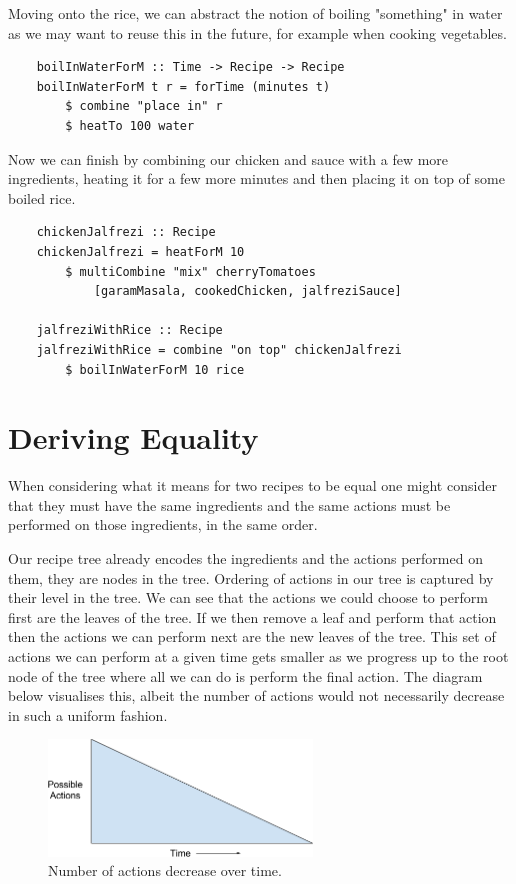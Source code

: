\documentclass[11pt]{article}
\begin{document}
Moving onto the rice, we can abstract the notion of boiling "something" in water as we may
want to reuse this in the future, for example when cooking vegetables.

\begin{lstlisting}
    boilInWaterForM :: Time -> Recipe -> Recipe
    boilInWaterForM t r = forTime (minutes t) 
        $ combine "place in" r
        $ heatTo 100 water
\end{lstlisting}

Now we can finish by combining our chicken and sauce with a few more ingredients,
heating it for a few more minutes and then placing it on top of some boiled rice.

\begin{lstlisting}
    chickenJalfrezi :: Recipe
    chickenJalfrezi = heatForM 10
        $ multiCombine "mix" cherryTomatoes
            [garamMasala, cookedChicken, jalfreziSauce]

    jalfreziWithRice :: Recipe
    jalfreziWithRice = combine "on top" chickenJalfrezi
        $ boilInWaterForM 10 rice
\end{lstlisting}

\section{Deriving Equality}

When considering what it means for two recipes to be equal one
might consider that they must have the same ingredients
and the same actions must be performed on those ingredients,
in the same order.

\medbreak

Our recipe tree already encodes the ingredients and the actions
performed on them, they are nodes in the tree. Ordering of
actions in our tree is captured by their level in the tree.
We can see that the actions we could choose to perform first
are the leaves of the tree. If we then remove a leaf and perform
that action then the actions we can perform next are the new
leaves of the tree. This set of actions we can perform at a given time
gets smaller as we progress up to the root node of the tree where all
we can do is perform the final action. The diagram below visualises
this, albeit the number of actions would not necessarily decrease
in such a uniform fashion.

\begin{figure}[h]
\includegraphics[width=7cm, keepaspectratio]{actionsOverTime.png}
\centering
\caption{Number of actions decrease over time.}
\end{figure}
\end{document}

